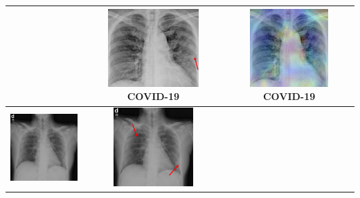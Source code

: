 \begin{longtable} { | c | c | c | }
\begin{minipage}{.3\textwidth}
    \end{minipage}
    &
  \begin{minipage}{.3\textwidth}
      \vspace{1em}
      \includegraphics[width=\linewidth, height=30mm]{Images/covidRadio1.png}
           \centering  COVID-19
               \vspace{0.5em}
    \end{minipage}
    & 
    \begin{minipage}{.3\textwidth}
        \vspace{1em}
      \includegraphics[width=\linewidth, height=30mm]{Images/covidHeatmap1.jpg}
      \centering COVID-19
          \vspace{0.5em}
    \end{minipage}
    \\ \hline
          \begin{minipage}{.3\textwidth}
    \vspace{1em}
      \includegraphics[width=\linewidth, height=30mm]{Images/covidOrig2.jpg}
    \vspace{0.5em}
    \end{minipage}
    &
  \begin{minipage}{.3\textwidth}
      \vspace{1em}
      \includegraphics[width=\linewidth, height=30mm]{Images/covidRadio2.png}

\end{minipage}
\end{longtable}

